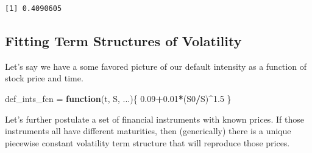 \documentclass[]{article}
\newenvironment{Shaded}{\begin{snugshade}}{\end{snugshade}}
\newcommand{\FloatTok}[1]{\textcolor[rgb]{0.00,0.00,0.81}{#1}}
\newcommand{\StringTok}[1]{\textcolor[rgb]{0.31,0.60,0.02}{#1}}
\newcommand{\ControlFlowTok}[1]{\textcolor[rgb]{0.13,0.29,0.53}{\textbf{#1}}}
\newcommand{\OperatorTok}[1]{\textcolor[rgb]{0.81,0.36,0.00}{\textbf{#1}}}
\newcommand{\NormalTok}[1]{#1}
\begin{document}
\begin{verbatim}
[1] 0.4090605
\end{verbatim}

\subsection{Fitting Term Structures of
Volatility}\label{fitting-term-structures-of-volatility}

Let's say we have a some favored picture of our default intensity as a
function of stock price and time.

\begin{Shaded}
\begin{Highlighting}[]
\NormalTok{  def_ints_fcn =}\StringTok{ }\ControlFlowTok{function}\NormalTok{(t, S, ...)\{}
    \FloatTok{0.09}\OperatorTok{+}\FloatTok{0.01}\OperatorTok{*}\NormalTok{(S0}\OperatorTok{/}\NormalTok{S)}\OperatorTok{^}\FloatTok{1.5}
\NormalTok{    \}}
\end{Highlighting}
\end{Shaded}

Let's further postulate a set of financial instruments with known
prices. If those instruments all have different maturities, then
(generically) there is a unique piecewise constant volatility term
structure that will reproduce those prices.
\end{document}
